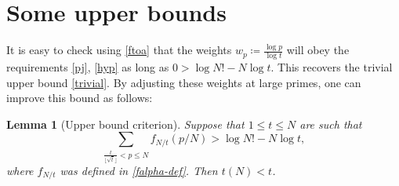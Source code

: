 \documentclass[12pt,a4paper,reqno]{amsart}
\numberwithin{equation}{section}
\theoremstyle{plain}
\newtheorem{lemma}[theorem]{Lemma}
\theoremstyle{definition}
\begin{document}
\section{Some upper bounds}\label{upper-sec}

It is easy to check using \eqref{ftoa} that the weights $w_p \coloneqq \frac{\log p}{\log t}$ will obey the requirements \eqref{pj}, \eqref{hyp} as long as $0 > \log N! - N \log t$.  This recovers the trivial upper bound \eqref{trivial}.  By adjusting these weights at large primes, one can improve this bound as follows:

\begin{lemma}[Upper bound criterion]\label{upper-crit}  Suppose that $1 \leq t \leq N$ are such that
  \begin{equation}\label{contra}
     \sum_{\frac{t}{\lfloor\sqrt{t}\rfloor} < p \leq N} f_{N/t}(p/N) > \log N! - N \log t,
  \end{equation}
  where $f_{N/t}$ was defined in \eqref{falpha-def}.
  Then $t(N) < t$.
  \end{lemma}
\end{document}
